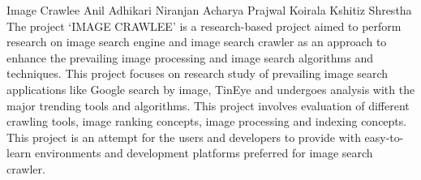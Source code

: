  \begin{conf-abstract}[]
 {Image Crawlee}
{
Anil Adhikari
Niranjan Acharya
Prajwal Koirala
Kshitiz Shrestha
}
{}
The project `IMAGE CRAWLEE' is a research-based project aimed to perform research on image search 
engine and image search crawler as an approach to enhance the prevailing image processing and image 
search algorithms and techniques. This project focuses on research study of prevailing image search 
applications like Google search by image, TinEye and undergoes analysis with the major trending tools 
and algorithms. This project involves evaluation of different crawling tools, image ranking concepts,
image processing and indexing concepts. This project is an attempt for the users and developers to 
provide with easy-to-learn environments and development platforms preferred for image search crawler.
  \end{conf-abstract}
